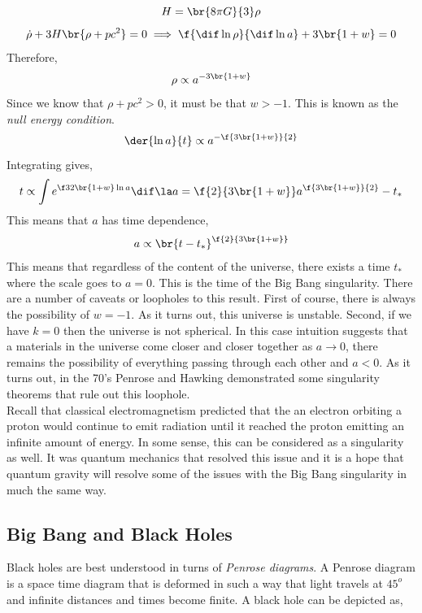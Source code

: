 \documentclass{article}
\begin{document}
\[ H = \br{8 \pi G}{3} \rho \]
\[ \dot \rho + 3 H \br{\rho + p c^2} = 0 \implies \f{\dif \ln \rho}{\dif \ln a} + 3 \br{1 + w} = 0 \]
Therefore,
\[ \rho \propto a^{- 3\br{1 + w}} \]
Since we know that $\rho + p c^2 > 0$, it must be that $w > -1$. This is known as the \textit{null energy condition}.
\[ \der{\ln a}{t} \propto a^{- \f{3\br{1 + w}}{2}} \]
Integrating gives,
\[ t \propto \int e^{\f32 \br{1 + w} \ln a} \dif \la a = \f{2}{3 \br{1 + w}} a^{\f{3\br{1 + w}}{2}} - t_{*} \]
This means that $a$ has time dependence,
\[ a \propto \br{t - t_{*}}^{\f{2}{3\br{1 + w}}} \]
This means that regardless of the content of the universe, there exists a time $t_{*}$ where the scale goes to $a = 0$. This is the time of the Big Bang singularity. There are a number of caveats or loopholes to this result. First of course, there is always the possibility of $w = -1$. As it turns out, this universe is unstable. Second, if we have $k = 0$ then the universe is not spherical. In this case intuition suggests that a materials in the universe come closer and closer together as $a \to 0$, there remains the possibility of everything passing through each other and $a < 0$. As it turns out, in the 70's Penrose and Hawking demonstrated some singularity theorems that rule out this loophole. \\

Recall that classical electromagnetism predicted that the an electron orbiting a proton would continue to emit radiation until it reached the proton emitting an infinite amount of energy. In some sense, this can be considered as a singularity as well. It was quantum mechanics that resolved this issue and it is a hope that quantum gravity will resolve some of the issues with the Big Bang singularity in much the same way. \\

\subsection{Big Bang and Black Holes}

Black holes are best understood in turns of \textit{Penrose diagrams}. A Penrose diagram is a space time diagram that is deformed in such a way that light travels at $45^{o}$ and infinite distances and times become finite. A black hole can be depicted as,

\begin{center}
\end{center}
\end{document}

